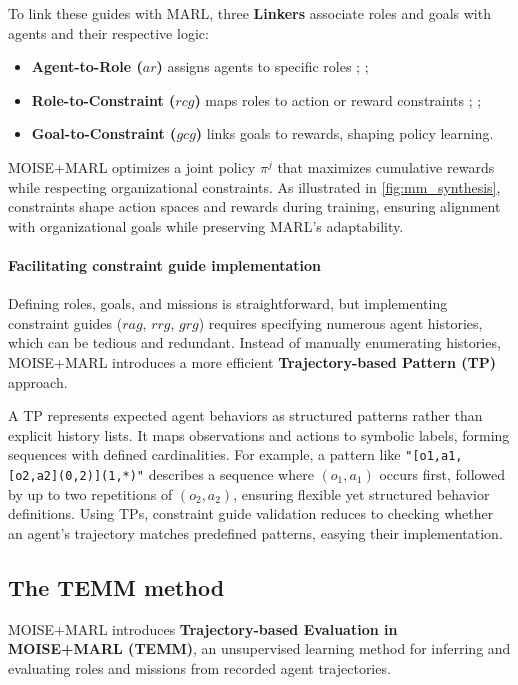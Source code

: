 \documentclass[pdflatex,sn-mathphys-num]{sn-jnl}%
\theoremstyle{thmstyleone}%
\theoremstyle{thmstyletwo}%
\theoremstyle{thmstylethree}%
\begin{document}
To link these guides with MARL, three \textbf{Linkers} associate roles and goals with agents and their respective logic:
\begin{itemize}
    \item \textbf{Agent-to-Role ($ar$)} assigns agents to specific roles ; ;
    \item \textbf{Role-to-Constraint ($rcg$)} maps roles to action or reward constraints ; ;
    \item \textbf{Goal-to-Constraint ($gcg$)} links goals to rewards, shaping policy learning.
\end{itemize}

MOISE+MARL optimizes a joint policy $\pi^{j}$ that maximizes cumulative rewards while respecting organizational constraints. As illustrated in \autoref{fig:mm_synthesis}, constraints shape action spaces and rewards during training, ensuring alignment with organizational goals while preserving MARL's adaptability.

\paragraph{Facilitating constraint guide implementation}

Defining roles, goals, and missions is straightforward, but implementing constraint guides ($rag$, $rrg$, $grg$) requires specifying numerous agent histories, which can be tedious and redundant. Instead of manually enumerating histories, MOISE+MARL introduces a more efficient \textbf{Trajectory-based Pattern (TP)} approach.

A TP represents expected agent behaviors as structured patterns rather than explicit history lists. It maps observations and actions to symbolic labels, forming sequences with defined cardinalities. For example, a pattern like \texttt{"[o1,a1,[o2,a2](0,2)](1,*)"} describes a sequence where $(o_1, a_1)$ occurs first, followed by up to two repetitions of $(o_2, a_2)$, ensuring flexible yet structured behavior definitions.
Using TPs, constraint guide validation reduces to checking whether an agent's trajectory matches predefined patterns, easying their implementation.


\subsection{The TEMM method}

MOISE+MARL introduces \textbf{Trajectory-based Evaluation in MOISE+MARL (TEMM)}, an unsupervised learning method for inferring and evaluating roles and missions from recorded agent trajectories.
\end{document}

